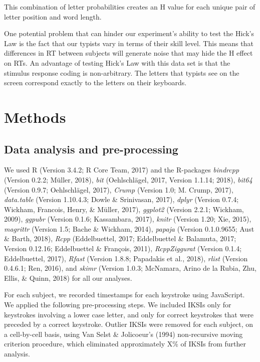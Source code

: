 \documentclass[floatsintext,man]{apa6}
\theoremstyle{definition}
\theoremstyle{definition}
\theoremstyle{definition}
\theoremstyle{remark}
\begin{document}
This combination of letter probabilities creates an H value for each
unique pair of letter position and word length.

One potential problem that can hinder our experiment's ability to test
the Hick's Law is the fact that our typists vary in terms of their skill
level. This means that differences in RT between subjects will generate
noise that may hide the H effect on RTs. An advantage of testing Hick's
Law with this data set is that the stimulus response coding is
non-arbitrary. The letters that typists see on the screen correspond
exactly to the letters on their keyboards.

\section{Methods}\label{methods}

\subsection{Data analysis and
pre-processing}\label{data-analysis-and-pre-processing}

We used R (Version 3.4.2; R Core Team, 2017) and the R-packages
\emph{bindrcpp} (Version 0.2.2; Müller, 2018), \emph{bit} (Oehlschlägel,
2017, Version 1.1.14; 2018), \emph{bit64} (Version 0.9.7; Oehlschlägel,
2017), \emph{Crump} (Version 1.0; M. Crump, 2017), \emph{data.table}
(Version 1.10.4.3; Dowle \& Srinivasan, 2017), \emph{dplyr} (Version
0.7.4; Wickham, Francois, Henry, \& Müller, 2017), \emph{ggplot2}
(Version 2.2.1; Wickham, 2009), \emph{ggpubr} (Version 0.1.6;
Kassambara, 2017), \emph{knitr} (Version 1.20; Xie, 2015),
\emph{magrittr} (Version 1.5; Bache \& Wickham, 2014), \emph{papaja}
(Version 0.1.0.9655; Aust \& Barth, 2018), \emph{Rcpp} (Eddelbuettel,
2017; Eddelbuettel \& Balamuta, 2017; Version 0.12.16; Eddelbuettel \&
François, 2011), \emph{RcppZiggurat} (Version 0.1.4; Eddelbuettel,
2017), \emph{Rfast} (Version 1.8.8; Papadakis et al., 2018),
\emph{rlist} (Version 0.4.6.1; Ren, 2016), and \emph{skimr} (Version
1.0.3; McNamara, Arino de la Rubia, Zhu, Ellis, \& Quinn, 2018) for all
our analyses.

For each subject, we recorded timestamps for each keystroke using
JavaScript. We applied the following pre-processing steps. We included
IKSIs only for keystrokes involving a lower case letter, and only for
correct keystrokes that were preceded by a correct keystroke. Outlier
IKSIs were removed for each subject, on a cell-by-cell basis, using Van
Selst \& Jolicoeur's (1994) non-recursive moving criterion procedure,
which eliminated approximately X\% of IKSIs from further analysis.
\end{document}
